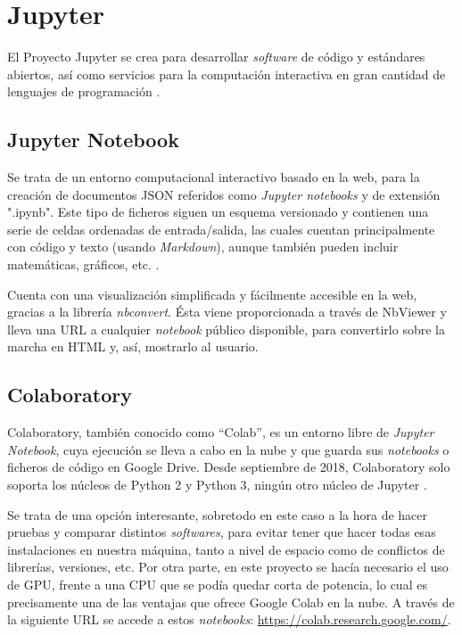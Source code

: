 \section{Jupyter}

El Proyecto Jupyter se crea para desarrollar \textit{software} de código y estándares abiertos, así como servicios para la computación interactiva en gran cantidad de lenguajes de programación \cite{wiki:jupyter}.


\subsection{Jupyter Notebook}

Se trata de un entorno computacional interactivo basado en la web, para la creación de documentos JSON referidos como \textit{Jupyter notebooks} y de extensión ".ipynb". Este tipo de ficheros siguen un esquema versionado y contienen una serie de celdas ordenadas de entrada/salida, las cuales cuentan principalmente con código y texto (usando \textit{Markdown}), aunque también pueden incluir matemáticas, gráficos, etc. \cite{wiki:jupyter}.

Cuenta con una visualización simplificada y fácilmente accesible en la web, gracias a la librería \textit{nbconvert}. Ésta viene proporcionada a través de NbViewer y lleva una URL a cualquier \textit{notebook} público disponible, para convertirlo sobre la marcha en HTML y, así, mostrarlo al usuario.


\subsection{Colaboratory}

Colaboratory, también conocido como ``Colab'', es un entorno libre de \textit{Jupyter Notebook}, cuya ejecución se lleva a cabo en la nube y que guarda sus \textit{notebooks}
o ficheros de código en Google Drive. Desde septiembre de 2018, Colaboratory solo soporta los núcleos de Python 2 y Python 3, ningún otro núcleo de Jupyter \cite{wiki:jupyter}.

 Se trata de una opción interesante, sobretodo en este caso a la hora de hacer pruebas y comparar distintos \textit{softwares}, para evitar tener que hacer todas esas instalaciones en nuestra máquina, tanto a nivel de espacio como de conflictos de librerías, versiones, etc. Por otra parte, en este proyecto se hacía necesario el uso de GPU, frente a una CPU que se podía quedar corta de potencia, lo cual es precisamente una de las ventajas que ofrece Google Colab en la nube. A través de la siguiente URL se accede a estos \textit{notebooks}: \url{https://colab.research.google.com/}.


